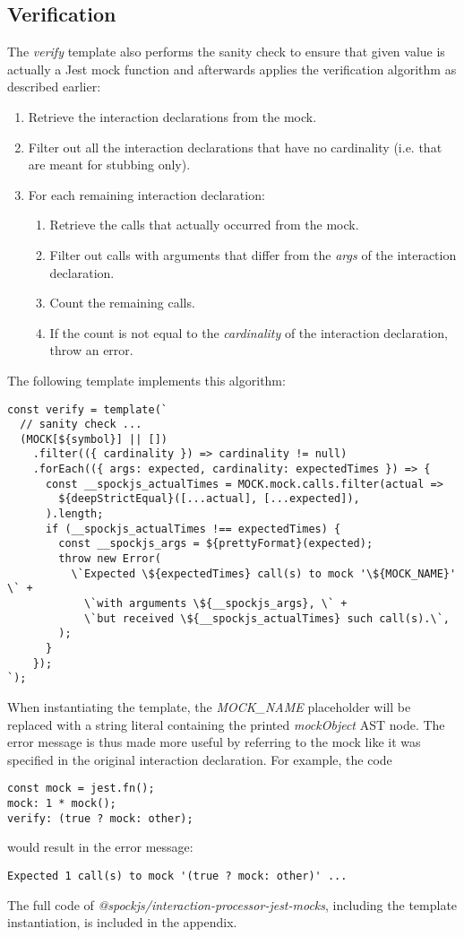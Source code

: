 \subsection{Verification}
The \textit{verify} template also performs the sanity check
to ensure that given value is actually a Jest mock function
and afterwards applies the verification algorithm as described earlier:
\begin{enumerate}
  \item Retrieve the interaction declarations from the mock.
  \item Filter out all the interaction declarations that have no cardinality
    (i.e. that are meant for stubbing only).
  \item For each remaining interaction declaration:
    \begin{enumerate}
      \item Retrieve the calls that actually occurred from the mock.
      \item Filter out calls with arguments that differ from
        the \textit{args} of the interaction declaration.
      \item Count the remaining calls.
      \item If the count is not equal to
        the \textit{cardinality} of the interaction declaration,
        throw an error.
    \end{enumerate}
\end{enumerate}

The following template implements this algorithm:
\begin{verbatim}
const verify = template(`
  // sanity check ...
  (MOCK[${symbol}] || [])
    .filter(({ cardinality }) => cardinality != null)
    .forEach(({ args: expected, cardinality: expectedTimes }) => {
      const __spockjs_actualTimes = MOCK.mock.calls.filter(actual =>
        ${deepStrictEqual}([...actual], [...expected]),
      ).length;
      if (__spockjs_actualTimes !== expectedTimes) {
        const __spockjs_args = ${prettyFormat}(expected);
        throw new Error(
          \`Expected \${expectedTimes} call(s) to mock '\${MOCK_NAME}' \` +
            \`with arguments \${__spockjs_args}, \` +
            \`but received \${__spockjs_actualTimes} such call(s).\`,
        );
      }
    });
`);
\end{verbatim}

When instantiating the template,
the \textit{MOCK\_NAME} placeholder
will be replaced with a string literal
containing the printed
\textit{mockObject} AST node.
The error message is thus made more useful
by referring to the mock like it was specified
in the original interaction declaration.
For example, the code
\begin{verbatim}
const mock = jest.fn();
mock: 1 * mock();
verify: (true ? mock: other);
\end{verbatim}
would result in the error message:
\begin{verbatim}
Expected 1 call(s) to mock '(true ? mock: other)' ...
\end{verbatim}

The full code of \textit{@spockjs/interaction-processor-jest-mocks},
including the template instantiation,
is included in the appendix.
